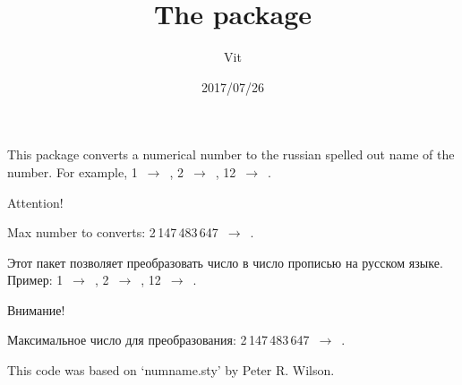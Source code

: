 \documentclass[pagesize=auto, parskip=full, fontsize=14pt, DIV=9]{scrartcl}
\title{The \pkg{numnameru} package}
\author{Vit}
\date{2017/07/26}
\begin{document}
\maketitle
\par This package converts a numerical number to the russian spelled out
name of the number. For example, 1~$\to$~, 2~$\to$~, 12~$\to$~.%
\par Attention!%
\par Max number to converts: 2\,147\,483\,647~$\to$~.%
\par Этот пакет позволяет преобразовать число в число прописью на русском языке.
Пример: 1~$\to$~, 2~$\to$~, 12~$\to$~.%
\par Внимание!%
\par Максимальное число для преобразования: 2\,147\,483\,647~$\to$~.%
\par This code was based on `numname.sty' by Peter R. Wilson.%
\end{document}

